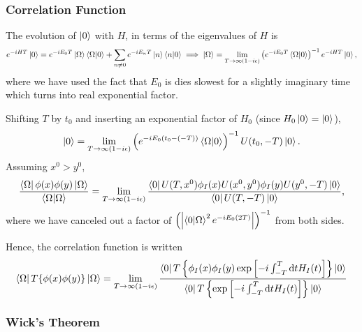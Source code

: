 \documentclass{article}
\begin{document}
\subsubsection{Correlation Function}

The evolution of $\ket 0$ with $H$, in terms of the eigenvalues of $H$ is 
$$e^{-iHT}\ket 0=e^{-iE_0T}\ket\Omega\braket{\Omega}{0}+\sum_{n\ne 0}e^{-iE_nT}\ket n\braket{n}{0}\implies\ket\Omega=\lim_{T\to\infty(1-i\epsilon)}\left(e^{-iE_0T}\braket{\Omega}{0}\right)^{-1}e^{-iHT}\ket 0,$$
where we have used the fact that $E_0$ is dies slowest for a slightly imaginary time which turns into real exponential factor. 

Shifting $T$ by $t_0$ and inserting an exponential factor of $H_0$ (since $H_0\ket 0=\ket 0$), 
$$\ket 0=\lim_{T\to\infty(1-i\epsilon)}\left(e^{-iE_0(t_0-(-T))}\braket{\Omega}{0}\right)^{-1}U(t_0,-T)\ket 0.$$
Assuming $x^0>y^0$, 
$$\frac{\bra\Omega\phi(x)\phi(y)\ket\Omega}{\braket{\Omega}{\Omega}}=\lim_{T\to\infty(1-i\epsilon)}\frac{\bra 0U(T,x^0)\phi_I(x)U(x^0,y^0)\phi_I(y)U(y^0,-T)\ket 0}{\bra 0U(T,-T)\ket 0},$$
where we have canceled out a factor of $\left(\left\lvert\braket{0}{\Omega}^2e^{-iE_0(2T)}\right\rvert\right)^{-1}$ from both sides.

Hence, the correlation function is written 
\begin{equation}
    \bra\Omega T\{\phi(x)\phi(y)\}\ket\Omega=\lim_{T\to\infty(1-i\epsilon)}\frac{\bra 0T\left\{\phi_I(x)\phi_I(y)\exp\left[-i\int^T_{-T}\dd t H_I(t)\right]\right\}\ket 0}{\bra 0T\left\{\exp\left[-i\int^T_{-T}\dd tH_I(t)\right]\right\}\ket 0}
\end{equation}

\subsubsection{Wick's Theorem}
\end{document}
